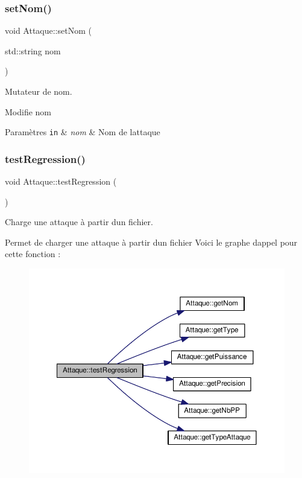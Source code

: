 \subsubsection{\texorpdfstring{set\+Nom()}{setNom()}}
{\footnotesize\ttfamily void Attaque\+::set\+Nom (\begin{DoxyParamCaption}\item[{std\+::string}]{nom }\end{DoxyParamCaption})}



Mutateur de nom. 

Modifie nom 
\begin{DoxyParams}[1]{Paramètres}
\mbox{\tt in}  & {\em nom} & Nom de l\textquotesingle{}attaque \\
\hline
\end{DoxyParams}
\mbox{\label{class_attaque_a8017dbfbf4af62e113d27d093a2786c6}} 
\subsubsection{\texorpdfstring{test\+Regression()}{testRegression()}}
{\footnotesize\ttfamily void Attaque\+::test\+Regression (\begin{DoxyParamCaption}{ }\end{DoxyParamCaption})}



Charge une attaque à partir d\textquotesingle{}un fichier. 

Permet de charger une attaque à partir d\textquotesingle{}un fichier Voici le graphe d\textquotesingle{}appel pour cette fonction \+:\nopagebreak
\begin{figure}[H]
\begin{center}
\leavevmode
\includegraphics[width=350pt]{class_attaque_a8017dbfbf4af62e113d27d093a2786c6_cgraph}
\end{center}
\end{figure}


